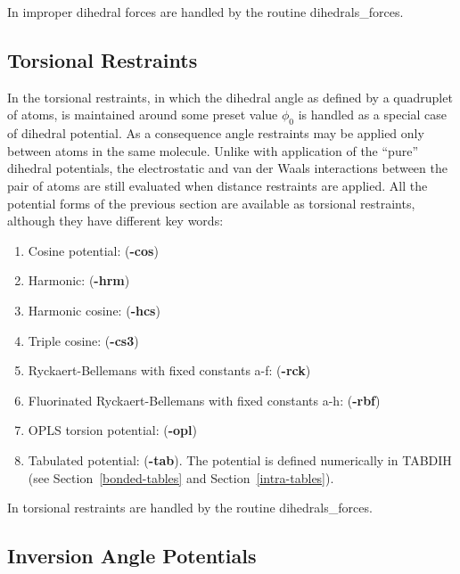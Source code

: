 In \D improper dihedral forces
are handled by the routine {\sc dihedrals\_forces}.

\subsection{Torsional Restraints}

In \D the torsional restraints, in which the dihedral angle as defined
by a quadruplet of atoms, is maintained around some preset value $\phi_{0}$
is handled as a special case of dihedral potential.
As a consequence angle restraints may be applied only between atoms
in the same molecule.  Unlike with application of the ``pure'' dihedral
potentials, the electrostatic and
van der Waals interactions between
the pair of atoms are still evaluated when distance restraints are
applied.  All the potential forms of the previous section are
available as torsional restraints, although they have different key
words:

\begin{enumerate}
\item Cosine potential:  ({\bf -cos})
\item Harmonic:  ({\bf -hrm})
\item Harmonic cosine:  ({\bf -hcs})
\item Triple cosine:  ({\bf -cs3})
\item Ryckaert-Bellemans \cite{ryckaert-75a} with fixed constants
a-f: ({\bf -rck})
\item Fluorinated Ryckaert-Bellemans \cite{schmidt-96a} with fixed
constants a-h:  ({\bf -rbf})
\item OPLS torsion potential:  ({\bf -opl})
\item Tabulated potential:  ({\bf -tab}).  The potential is defined numerically in TABDIH (see Section~\ref{bonded-tables} and Section~\ref{intra-tables}).
\end{enumerate}

In \D torsional restraints are handled by
the routine {\sc dihedrals\_forces}.

\subsection{Inversion Angle Potentials}
\label{inversion-potentials}


